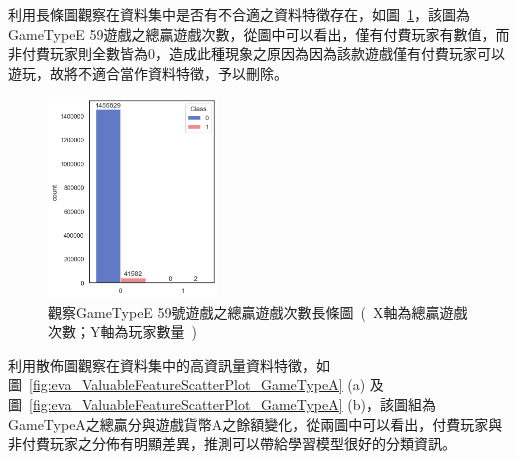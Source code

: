 利用長條圖觀察在資料集中是否有不合適之資料特徵存在，如圖~\ref{fig:eva_UnreasonableFeatureBarPlot}，該圖為GameTypeE 59遊戲之總贏遊戲次數，從圖中可以看出，僅有付費玩家有數值，而非付費玩家則全數皆為0，造成此種現象之原因為因為該款遊戲僅有付費玩家可以遊玩，故將不適合當作資料特徵，予以刪除。

\begin{figure}[!htb]
    \begin{center}
      \includegraphics[width=0.4\textwidth]{figures/evaluation/Image_UnreasonableFeatureBarPlot.png}
      \caption[觀察GameTypeE 59號遊戲之總贏遊戲次數長條圖]{觀察GameTypeE 59號遊戲之總贏遊戲次數長條圖\ (\ X軸為總贏遊戲次數；Y軸為玩家數量\ )\ }
      \label{fig:eva_UnreasonableFeatureBarPlot}
    \end{center}
\end{figure}
\newpage

利用散佈圖觀察在資料集中的高資訊量資料特徵，如圖~\ref{fig:eva_ValuableFeatureScatterPlot_GameTypeA} (a) 及圖~\ref{fig:eva_ValuableFeatureScatterPlot_GameTypeA} (b)，該圖組為GameTypeA之總贏分與遊戲貨幣A之餘額變化，從兩圖中可以看出，付費玩家與非付費玩家之分佈有明顯差異，推測可以帶給學習模型很好的分類資訊。

